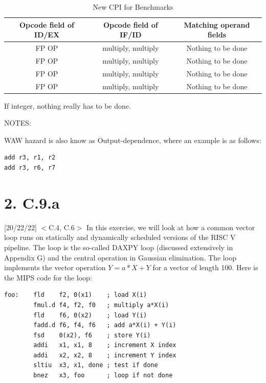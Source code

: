 \documentclass[11pt]{article}
\begin{document}
\begin{table}[ht]
\caption{New CPI for Benchmarks} %
\centering %
\begin{tabular}{c c c} %
\hline\hline %
Opcode field of ID/EX & Opcode field of IF/ID & Matching operand fields \\ [0.5ex] %
\hline %
FP OP & multiply, multiply  & Nothing to be done \\
FP OP & multiply, multiply  & Nothing to be done \\
FP OP & multiply, multiply  & Nothing to be done \\
FP OP & multiply, multiply  & Nothing to be done \\
[1ex] %
\hline %
\end{tabular}
\label{table:nonlin} %
\end{table}

If integer, nothing really has to be done.

NOTES:

WAW hazard is also know as Output-dependence,
where an example is as follows: \\

\begin{verbatim}
add r3, r1, r2
add r3, r6, r7
\end{verbatim}



\newpage
\section*{2. C.9.a}

[20/22/22] $<$C.4, C.6$>$ In this exercise, we will look at how a common vector loop runs on statically and dynamically scheduled versions of the RISC V pipeline. The loop is the so-called DAXPY loop (discussed extensively in Appendix G) and the central operation in Gaussian elimination. The loop implements the vector operation $Y=a*X+Y$ for a vector of length 100. Here is the MIPS code for the loop:

\begin{verbatim}
foo:    fld    f2, 0(x1)    ; load X(i)
        fmul.d f4, f2, f0   ; multiply a*X(i)
        fld    f6, 0(x2)    ; load Y(i)
        fadd.d f6, f4, f6   ; add a*X(i) + Y(i)
        fsd    0(x2), f6    ; store Y(i)
        addi   x1, x1, 8    ; increment X index
        addi   x2, x2, 8    ; increment Y index
        sltiu  x3, x1, done ; test if done
        bnez   x3, foo      ; loop if not done
\end{verbatim}
\end{document}
